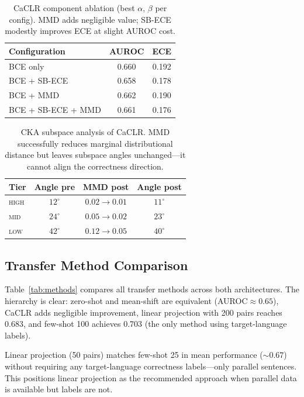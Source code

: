 \documentclass[11pt,a4paper]{article}
\newcommand{\auroc}{AUROC}
\begin{document}
\begin{table}[t]
\centering
\small
\begin{tabular}{lcc}
\toprule
Configuration & \auroc{} & ECE \\
\midrule
BCE only & 0.660 & 0.192 \\
BCE + SB-ECE & 0.658 & 0.178 \\
BCE + MMD & 0.662 & 0.190 \\
BCE + SB-ECE + MMD & 0.661 & 0.176 \\
\bottomrule
\end{tabular}
\caption{CaCLR component ablation (best $\alpha$, $\beta$ per config). MMD adds negligible value; SB-ECE modestly improves ECE at slight \auroc{} cost.}
\label{tab:component_ablation}
\end{table}

\begin{table}[t]
\centering
\small
\begin{tabular}{lccc}
\toprule
Tier & Angle pre & MMD post & Angle post \\
\midrule
\textsc{high} & $12^\circ$ & $0.02 \to 0.01$ & $11^\circ$ \\
\textsc{mid}  & $24^\circ$ & $0.05 \to 0.02$ & $23^\circ$ \\
\textsc{low}  & $42^\circ$ & $0.12 \to 0.05$ & $40^\circ$ \\
\bottomrule
\end{tabular}
\caption{CKA subspace analysis of CaCLR. MMD successfully reduces marginal distributional distance but leaves subspace angles unchanged---it cannot align the correctness direction.}
\label{tab:mmd_subspace}
\end{table}


\subsection{Transfer Method Comparison}
\label{sec:transfer}

Table~\ref{tab:methods} compares all transfer methods across both architectures. The hierarchy is clear: zero-shot and mean-shift are equivalent (\auroc{}$\approx 0.65$), CaCLR adds negligible improvement, linear projection with 200 pairs reaches 0.683, and few-shot 100 achieves 0.703 (the only method using target-language labels).

Linear projection (50 pairs) matches few-shot 25 in mean performance (${\sim}0.67$) without requiring any target-language correctness labels---only parallel sentences. This positions linear projection as the recommended approach when parallel data is available but labels are not.
\end{document}
